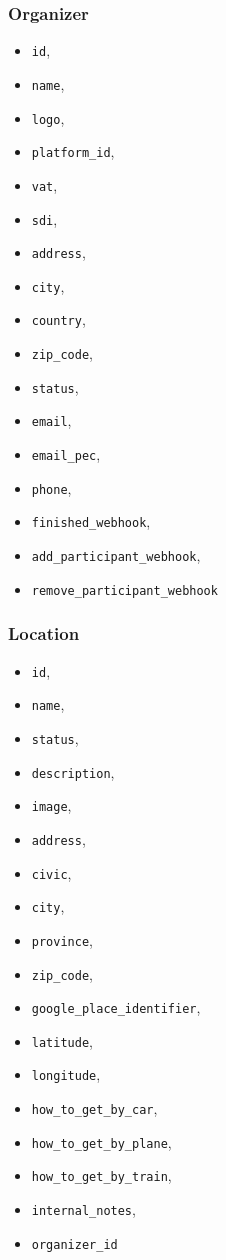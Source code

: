 \subsubsection{Organizer}
\begin{itemize}
	\item \verb|id|,
    \item \verb|name|,
    \item \verb|logo|,
    \item \verb|platform_id|,
    \item \verb|vat|,
    \item \verb|sdi|,
    \item \verb|address|,
    \item \verb|city|,
    \item \verb|country|,
    \item \verb|zip_code|,
    \item \verb|status|,
    \item \verb|email|,
    \item \verb|email_pec|,
    \item \verb|phone|,
    \item \verb|finished_webhook|,
    \item \verb|add_participant_webhook|,
    \item \verb|remove_participant_webhook|
\end{itemize}

\subsubsection{Location}
\begin{itemize}
	\item \verb|id|,
	\item \verb|name|,
	\item \verb|status|,
	\item \verb|description|,
	\item \verb|image|,
	\item \verb|address|,
	\item \verb|civic|,
	\item \verb|city|,
	\item \verb|province|,
	\item \verb|zip_code|,
	\item \verb|google_place_identifier|,
	\item \verb|latitude|,
	\item \verb|longitude|,
	\item \verb|how_to_get_by_car|,
	\item \verb|how_to_get_by_plane|,
	\item \verb|how_to_get_by_train|,
	\item \verb|internal_notes|,
	\item \verb|organizer_id|
\end{itemize}

